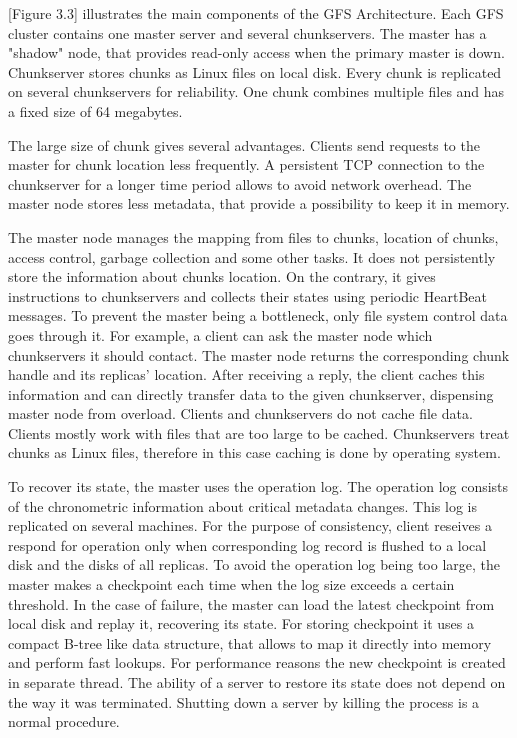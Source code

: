 [Figure 3.3] illustrates the main components of the GFS Architecture.
Each GFS cluster contains one master server and several chunkservers.
The master has a "shadow" node, that provides read-only access when the primary master is down. 
Chunkserver stores chunks as Linux files on local disk.
Every chunk is replicated on several chunkservers for reliability.
One chunk combines multiple files and has a fixed size of 64 megabytes.

The large size of chunk gives several advantages.
Clients send requests to the master for chunk location less frequently.
A persistent TCP connection to the chunkserver for a longer time period allows to avoid network overhead.
The master node stores less metadata, that provide a possibility to keep it in memory.

The master node manages the mapping from files to chunks, location of chunks, access control, garbage collection and some other tasks.
It does not persistently store the information about chunks location. 
On the contrary, it gives instructions to chunkservers and collects their states using periodic HeartBeat messages.
To prevent the master being a bottleneck, only file system control data goes through it.
For example, a client can ask the master node which chunkservers it should contact.
The master node returns the corresponding chunk handle and its replicas' location.
After receiving a reply, the client caches this information and can directly transfer data to the given chunkserver, dispensing master node from overload.
Clients and chunkservers do not cache file data.
Clients mostly work with files that are too large to be cached.
Chunkservers treat chunks as Linux files, therefore in this case caching is done by operating system.

To recover its state, the master uses the operation log.
The operation log consists of the chronometric information about critical metadata changes.
This log is replicated on several machines.
For the purpose of consistency, client reseives a respond for operation only when corresponding log record is flushed to a local disk and the disks of all replicas.
To avoid the operation log being too large, the master makes a checkpoint each time when the log size exceeds a certain threshold.
In the case of failure, the master can load the latest checkpoint from local disk and replay it, recovering its state.
For storing checkpoint it uses a compact B-tree like data structure, that allows to map it directly into memory and perform fast lookups.
For performance reasons the new checkpoint is created in separate thread.
The ability of a server to restore its state does not depend on the way it was terminated.
Shutting down a server by killing the process is a normal procedure. 

